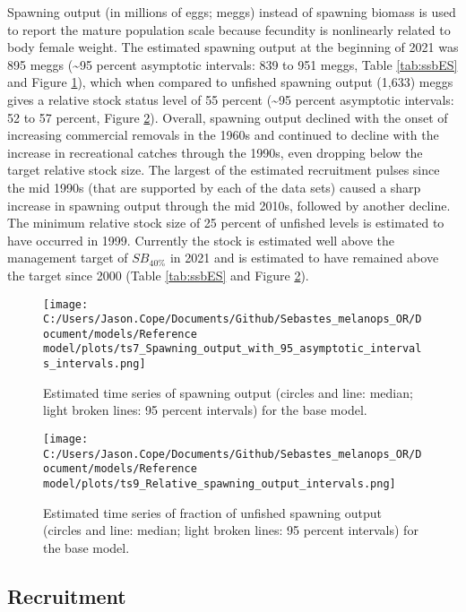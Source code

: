 \documentclass[11pt,
  english,
  letterpaper,
]{article}
\begin{document}
Spawning output (in millions of eggs; meggs) instead of spawning biomass is used to report the mature population scale because fecundity is nonlinearly related to body female weight. The estimated spawning output at the beginning of 2021 was 895 meggs (\textasciitilde95 percent asymptotic intervals: 839 to 951 meggs, Table \ref{tab:ssbES} and Figure \ref{fig:es-ssb}), which when compared to unfished spawning output (1,633) meggs gives a relative stock status level of 55 percent (\textasciitilde95 percent asymptotic intervals: 52 to 57 percent, Figure \ref{fig:es-depl}). Overall, spawning output declined with the onset of increasing commercial removals in the 1960s and continued to decline with the increase in recreational catches through the 1990s, even dropping below the target relative stock size. The largest of the estimated recruitment pulses since the mid 1990s (that are supported by each of the data sets) caused a sharp increase in spawning output through the mid 2010s, followed by another decline. The minimum relative stock size of 25 percent of unfished levels is estimated to have occurred in 1999. Currently the stock is estimated well above the management target of \(SB_{40\%}\) in 2021 and is estimated to have remained above the target since 2000 (Table \ref{tab:ssbES} and Figure \ref{fig:es-depl}).



\begin{figure}
\centering
\texttt{[image: C:/Users/Jason.Cope/Documents/Github/Sebastes\_melanops\_OR/Document/models/Reference model/plots/ts7\_Spawning\_output\_with\_95\_asymptotic\_intervals\_intervals.png]}
\caption{Estimated time series of spawning output (circles and line: median; light broken lines: 95 percent intervals) for the base model.\label{fig:es-ssb}}
\end{figure}

\begin{figure}
\centering
\texttt{[image: C:/Users/Jason.Cope/Documents/Github/Sebastes\_melanops\_OR/Document/models/Reference model/plots/ts9\_Relative\_spawning\_output\_intervals.png]}
\caption{Estimated time series of fraction of unfished spawning output (circles and line: median; light broken lines: 95 percent intervals) for the base model.\label{fig:es-depl}}
\end{figure}

\clearpage

\hypertarget{recruitment}{%
\subsection*{Recruitment}\label{recruitment}}
\end{document}
